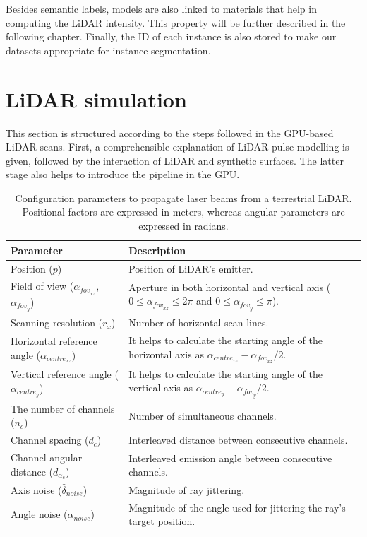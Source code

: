 Besides semantic labels, models are also linked to materials that help in computing the LiDAR intensity. This property will be further described in the following chapter. Finally, the ID of each instance is also stored to make our datasets appropriate for instance segmentation.

\section{LiDAR simulation}

This section is structured according to the steps followed in the GPU-based LiDAR scans. First, a comprehensible explanation of LiDAR pulse modelling is given, followed by the interaction of LiDAR and synthetic surfaces. The latter stage also helps to introduce the pipeline in the GPU. 

\renewcommand{\arraystretch}{1.2}
\begin{table}
    \small
    \centering
    \caption{Configuration parameters to propagate laser beams from a terrestrial LiDAR. Positional factors are expressed in meters, whereas angular parameters are expressed in radians.}
    \label{table:tls_parameters}
    \begin{tabular}{ll}
    \toprule
    \textbf{Parameter} & \textbf{Description} \\
    \midrule
    Position ($p$) & Position of LiDAR's emitter.\\
    Field of view ($\alpha_{\textit{fov}_{xz}}$, $\alpha_{\textit{fov}_{y}}$) & Aperture in both horizontal and vertical axis ($0 \leq \alpha_{\textit{fov}_{xz}} \leq 2\pi$ and $0 \leq \alpha_{\textit{fov}_{y}} \leq \pi$). \\
    Scanning resolution ($r_{x}$) & Number of horizontal scan lines. \\
    Horizontal reference angle ($\alpha_{\textit{centre}_{xz}}$) & It helps to calculate the starting angle of the horizontal axis as $\alpha_{\textit{centre}_{xz}} - \alpha_{\textit{fov}_{xz}} / 2$. \\
    Vertical reference angle ($\alpha_{\textit{centre}_{y}}$) & It helps to calculate the starting angle of the vertical axis as $\alpha_{\textit{centre}_{y}} - \alpha_{\textit{fov}_{y}} / 2$. \\
    The number of channels ($n_{c}$) & Number of simultaneous channels. \\
    Channel spacing ($d_{c}$) & Interleaved distance between consecutive channels.\\
    Channel angular distance ($d_{\alpha_{c}}$) & Interleaved emission angle between consecutive channels.\\
    Axis noise ($\hat{\delta}_{\textit{noise}}$) & Magnitude of ray jittering. \\
    Angle noise ($\alpha_{\textit{noise}}$) & Magnitude of the angle used for jittering the ray's target position. \\
    \bottomrule
    \end{tabular}
    \libertineNormal
\end{table}
\renewcommand{\arraystretch}{1}

